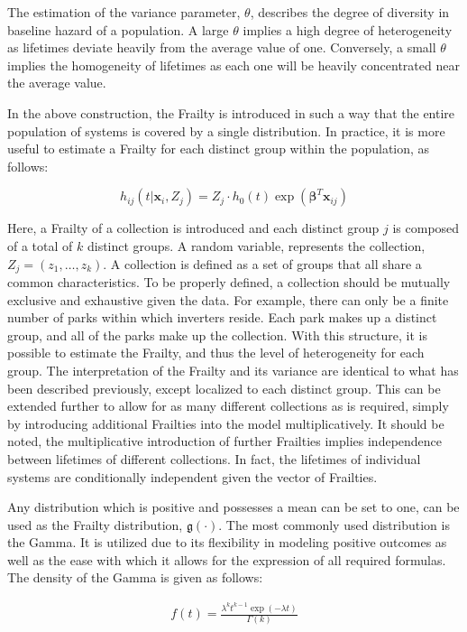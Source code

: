 The estimation of the variance parameter, $\theta$, describes the degree of diversity in baseline hazard of a population. A large $\theta$ implies a high degree of heterogeneity as lifetimes deviate heavily from the average value of one. Conversely, a small $\theta$ implies the homogeneity of lifetimes as each one will be heavily concentrated near the average value.


In the above construction, the Frailty is introduced in such a way that the entire population of systems is covered by a single distribution. In practice, it is more useful to estimate a Frailty for each distinct group within the population, as follows:

$$ h_{ij}(t|\textbf{x}_i, Z_j) = Z_j \cdot h_0(t) \exp(\boldsymbol\beta^T \textbf{x}_{ij})  $$

Here, a Frailty of a collection is introduced and each distinct group $j$ is composed of a total of $k$ distinct groups. A random variable, represents the collection, $Z_j = (z_1, \dots, z_k)$. A collection is defined as a set of groups that all share a common characteristics. To be properly defined, a collection should be mutually exclusive and exhaustive given the data. For example, there can only be a finite number of parks within which inverters reside. Each park makes up a distinct group, and all of the parks make up the collection. With this structure, it is possible to estimate the Frailty, and thus the level of heterogeneity for each group. The interpretation of the Frailty and its variance are identical to what has been described previously, except localized to each distinct group. This can be extended further to allow for as many different collections as is required, simply by introducing additional Frailties into the model multiplicatively. It should be noted, the multiplicative introduction of further Frailties implies independence between lifetimes of different collections. In fact, the lifetimes of individual systems are conditionally independent given the vector of Frailties. 


Any distribution which is positive and possesses a mean can be set to one, can be used as the Frailty distribution, $\mathfrak{g}(\cdot)$. The most commonly used distribution is the Gamma. It is utilized due to its flexibility in modeling positive outcomes as well as the ease with which it allows for the expression of all required formulas\cite{Wienke2010}. The density of the Gamma is given as follows:

\begin{align*}
f(t) = \frac{\lambda^k t^{k-1} \exp(-\lambda t)}{\Gamma(k)} \tag{$ k>0, \lambda > 0 $}
\end{align*}


